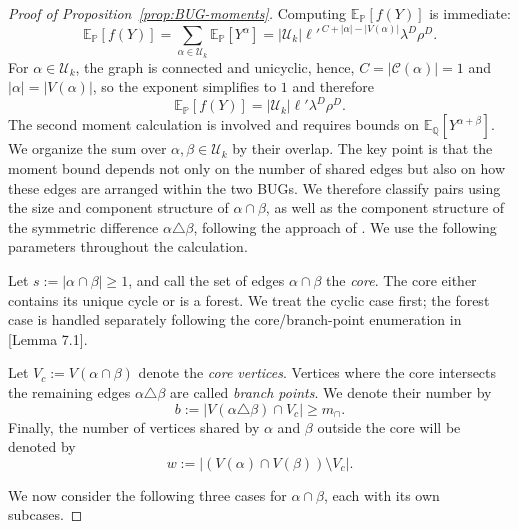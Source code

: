 \documentclass[11pt, letterpaper]{article}
\numberwithin{equation}{section}
\newcommand{\E}{\mathbb{E}}
\newcommand{\PP}{\mathbb{P}}
\newcommand{\QQ}{\mathbb{Q}}
\newcommand{\cU}{\mathcal{U}}
\begin{document}
\begin{proof}[Proof of Proposition~\ref{prop:BUG-moments}]
Computing $\E_{\PP}[f(Y)]$ is immediate:
\[
\E_{\PP}[f(Y)]
=\sum_{\alpha\in\mathcal{U}_k}\E_{\PP}[Y^\alpha]
=|\mathcal{U}_k| \ell'^{\,C+|\alpha|-|V(\alpha)|} \lambda^D\rho^D .
\]
For $\alpha\in\mathcal{U}_k$, the graph is connected and unicyclic, hence, $C=|\mathcal{C}(\alpha)|=1$ and $|\alpha|=|V(\alpha)|$, so the exponent simplifies to $1$ and therefore
\[
\E_{\PP}[f(Y)]  =  |\mathcal{U}_k| \ell' \lambda^D\rho^D .
\]
The second moment calculation is involved and requires bounds on $
\E_\QQ[Y^{\alpha + \beta}]$.
We organize the sum over $\alpha,\beta\in\cU_k$ by their overlap. The key point is that the moment bound depends not only on the number of shared edges but also on how these edges are arranged within the two BUGs. We therefore classify pairs using the size and component structure of $\alpha\cap\beta$, as well as the component structure of the symmetric difference  $\alpha\triangle\beta$, following the approach of \cite{sohn2025sharp}. We use the following parameters throughout the calculation.

\vspace{0.5em}

Let $s:=\bigl|\alpha \cap \beta\bigr|\geq1$, and call the set of edges 
$\alpha \cap \beta$ the \emph{core}. The core either contains its unique cycle or is a forest. We treat the cyclic case first; the forest case is handled separately following the core/branch-point enumeration in \cite{sohn2025sharp}[Lemma 7.1].

Let $V_c:=V(\alpha \cap \beta)$ denote the \emph{core vertices}. Vertices where the core intersects the remaining edges $\alpha \triangle \beta$ are called \emph{branch points}. We denote their number by
\begin{equation}\label{eq.defn_b}
    b := \bigl| V(\alpha \triangle \beta) \cap V_c \bigr| \ge m_\cap.
\end{equation}
Finally, the number of vertices shared by $\alpha$ and $\beta$ outside the core will be denoted by
\[w:=\bigl|(V(\alpha)\cap V(\beta)) \setminus V_c\bigr|.\]

\noindent We now consider the following three cases for $\alpha \cap \beta$, each with its own subcases.

\medskip


\end{proof}
\end{document}
